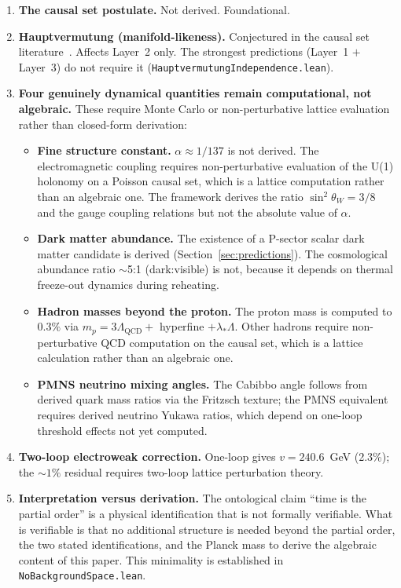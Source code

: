 \documentclass[11pt,letterpaper]{article}
\theoremstyle{remark}
\newcommand{\lean}[1]{\texttt{\small #1}}
\begin{document}
\begin{enumerate}[nosep]
  \item \textbf{The causal set postulate.} Not derived. Foundational.
  \item \textbf{Hauptvermutung (manifold-likeness).} Conjectured in
    the causal set literature~\cite{Surya2019}. Affects Layer~2 only.
    The strongest predictions (Layer~1 $+$ Layer~3) do not require it
    (\lean{Hauptvermutung\-Independence.lean}).
  \item \textbf{Four genuinely dynamical quantities remain
    computational, not algebraic.} These require Monte Carlo or
    non-perturbative lattice evaluation rather than closed-form
    derivation:
    \begin{itemize}[nosep]
      \item \textbf{Fine structure constant.} $\alpha \approx 1/137$
        is not derived. The electromagnetic coupling requires
        non-perturbative evaluation of the U(1) holonomy on a
        Poisson causal set, which is a lattice computation rather
        than an algebraic one. The framework derives the ratio
        $\sin^2\theta_W = 3/8$ and the gauge coupling relations but
        not the absolute value of $\alpha$.
      \item \textbf{Dark matter abundance.} The existence of a
        P-sector scalar dark matter candidate is derived
        (Section~\ref{sec:predictions}). The cosmological
        abundance ratio $\sim$5:1 (dark:visible) is not, because
        it depends on thermal freeze-out dynamics during reheating.
      \item \textbf{Hadron masses beyond the proton.} The proton
        mass is computed to $0.3\%$ via $m_p = 3\Lambda_{\mathrm{QCD}}
        + $ hyperfine $+ \lambda_* \Lambda$. Other hadrons require
        non-perturbative QCD computation on the causal set, which is
        a lattice calculation rather than an algebraic one.
      \item \textbf{PMNS neutrino mixing angles.} The Cabibbo angle
        follows from derived quark mass ratios via the Fritzsch
        texture; the PMNS equivalent requires derived neutrino
        Yukawa ratios, which depend on one-loop threshold effects
        not yet computed.
    \end{itemize}
  \item \textbf{Two-loop electroweak correction.} One-loop gives
    $v = 240.6$~GeV (2.3\%); the $\sim 1\%$ residual requires
    two-loop lattice perturbation theory.
  \item \textbf{Interpretation versus derivation.} The ontological
    claim ``time is the partial order'' is a physical identification
    that is not formally verifiable. What is verifiable is that no
    additional structure is needed beyond the partial order, the
    two stated identifications, and the Planck mass to derive the
    algebraic content of this paper. This minimality is established
    in \lean{NoBackgroundSpace.lean}.
\end{enumerate}
\end{document}
